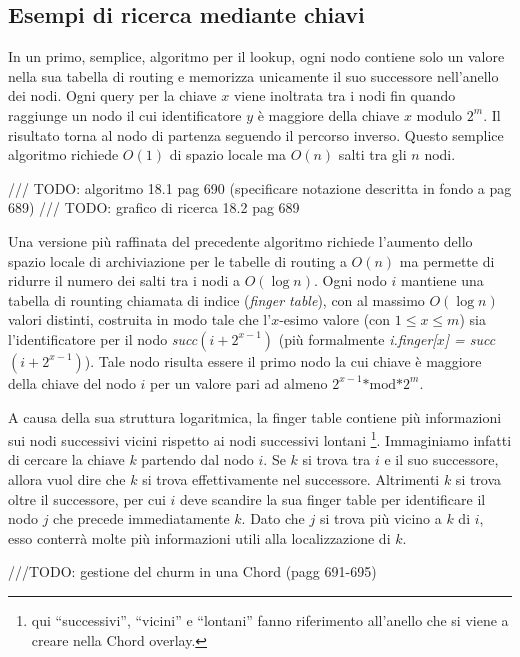 \subsection{Esempi di ricerca mediante
chiavi}\label{esempi-di-ricerca-mediante-chiavi}

In un primo, semplice, algoritmo per il lookup, ogni nodo contiene solo
un valore nella sua tabella di routing e memorizza unicamente il suo
successore nell'anello dei nodi. Ogni query per la chiave $x$ viene
inoltrata tra i nodi fin quando raggiunge un nodo il cui identificatore
$y$ è maggiore della chiave $x$ modulo $2^m$. Il risultato torna al nodo
di partenza seguendo il percorso inverso. Questo semplice algoritmo
richiede $O(1)$ di spazio locale ma $O(n)$ salti tra gli $n$ nodi.

/// TODO: algoritmo 18.1 pag 690 (specificare notazione descritta in
fondo a pag 689) /// TODO: grafico di ricerca 18.2 pag 689

Una versione più raffinata del precedente algoritmo richiede l'aumento
dello spazio locale di archiviazione per le tabelle di routing a $O(n)$
ma permette di ridurre il numero dei salti tra i nodi a $O(\log n)$.
Ogni nodo $i$ mantiene una tabella di rounting chiamata di indice
(\emph{finger table}), con al massimo $O(\log n)$ valori distinti,
costruita in modo tale che l'$x$-esimo valore (con $1 \leq x \leq m$)
sia l'identificatore per il nodo \emph{succ}$(i + 2^{x-1})$ (più
formalmente \emph{i.finger{[}$x${]} = succ}$(i + 2^{x-1})$). Tale nodo
risulta essere il primo nodo la cui chiave è maggiore della chiave del
nodo $i$ per un valore pari ad almeno $2^{x-1}\text{*mod*}2^m$.

A causa della sua struttura logaritmica, la finger table contiene più
informazioni sui nodi successivi vicini rispetto ai nodi successivi
lontani \footnote{qui ``successivi'', ``vicini'' e ``lontani'' fanno
  riferimento all'anello che si viene a creare nella Chord overlay.}.
Immaginiamo infatti di cercare la chiave $k$ partendo dal nodo $i$. Se
$k$ si trova tra $i$ e il suo successore, allora vuol dire che $k$ si
trova effettivamente nel successore. Altrimenti $k$ si trova oltre il
successore, per cui $i$ deve scandire la sua finger table per
identificare il nodo $j$ che precede immediatamente $k$. Dato che $j$ si
trova più vicino a $k$ di $i$, esso conterrà molte più informazioni
utili alla localizzazione di $k$.

///TODO: gestione del churm in una Chord (pagg 691-695)
